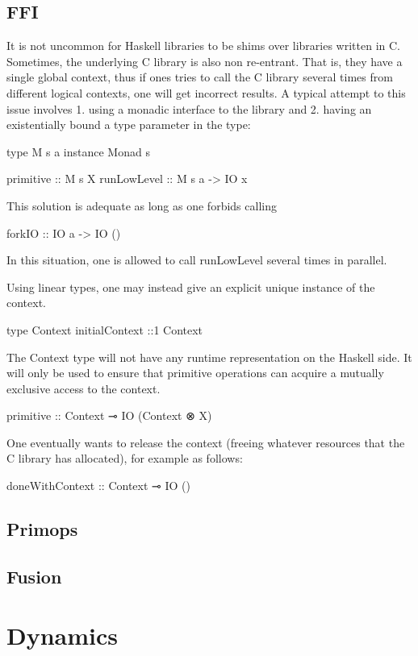 \documentclass[11pt]{article}
\begin{document}
\subsection{FFI}

It is not uncommon for Haskell libraries to be shims over libraries
written in C. Sometimes, the underlying C library is also non
re-entrant. That is, they have a single global context, thus if ones
tries to call the C library several times from different logical
contexts, one will get incorrect results. A typical attempt to this
issue involves
1. using a monadic interface to the library and
2. having an existentially bound a type parameter in the type:

type M s a
instance Monad s

primitive :: M s X
runLowLevel :: M s a -> IO x

This solution is adequate as long as one forbids calling

forkIO :: IO a -> IO ()

In this situation, one is allowed to call runLowLevel several times in
parallel.

Using linear types, one may instead give an explicit unique instance
of the context.

type Context
initialContext ::1 Context

The Context type will not have any runtime representation on the
Haskell side.  It will only be used to ensure that primitive
operations can acquire a mutually exclusive access to the context.

primitive :: Context ⊸ IO (Context ⊗ X)

One eventually wants to release the context (freeing whatever
resources that the C library has allocated), for example as follows:

doneWithContext :: Context ⊸ IO ()

\subsection{Primops}

\subsection{Fusion}

\section{Dynamics}
\label{sec:orgheadline16}
\end{document}
